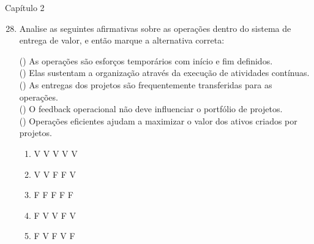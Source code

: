 \documentclass{beamer}
\begin{document}
\begin{frame}{Capítulo 2}
	\begin{enumerate}
		\setcounter{enumi}{27}
		\justifying
		\item Analise as seguintes afirmativas sobre as operações dentro do sistema de entrega de valor, e então marque a alternativa correta:
		
		\vspace{10pt} \footnotesize
		(\hspace{10pt}) As operações são esforços temporários com início e fim definidos.\\
		(\hspace{10pt}) Elas sustentam a organização através da execução de atividades contínuas.\\
		(\hspace{10pt}) As entregas dos projetos são frequentemente transferidas para as operações.\\
		(\hspace{10pt}) O feedback operacional não deve influenciar o portfólio de projetos.\\
		(\hspace{10pt}) Operações eficientes ajudam a maximizar o valor dos ativos criados por projetos.
		
		\vspace{10pt} \normalsize
		\begin{enumerate}[a]
			\justifying
			\item V V V V V
			\item V V F F V
			\item F F F F F
			\item \alert<2>{F V V F V}
			\item F V F V F
		\end{enumerate}
	\end{enumerate}
\end{frame}
\end{document}
